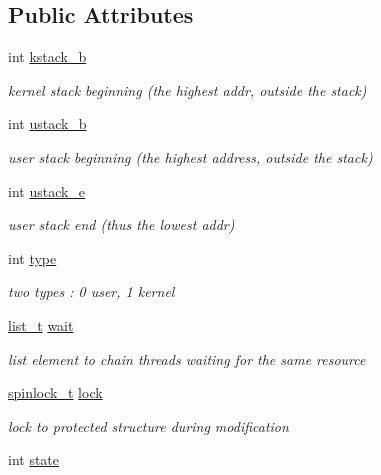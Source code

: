 \subsection*{Public Attributes}
\begin{DoxyCompactItemize}
\item 
int \hyperlink{structthread__s_a6885e765fcfe5d2ad0e5a07c2df3ee69}{kstack\-\_\-b}
\begin{DoxyCompactList}\small\item\em kernel stack beginning (the highest addr, outside the stack) \end{DoxyCompactList}\item 
int \hyperlink{structthread__s_a8d51270c2f7572479276f7629940c3ea}{ustack\-\_\-b}
\begin{DoxyCompactList}\small\item\em user stack beginning (the highest address, outside the stack) \end{DoxyCompactList}\item 
int \hyperlink{structthread__s_a021e8a50ddb4a5978f18d6babfc4ea6e}{ustack\-\_\-e}
\begin{DoxyCompactList}\small\item\em user stack end (thus the lowest addr) \end{DoxyCompactList}\item 
int \hyperlink{structthread__s_a2eda0c064f0ed88103b27bf2b5a640e2}{type}
\begin{DoxyCompactList}\small\item\em two types \-: 0 user, 1 kernel \end{DoxyCompactList}\item 
\hyperlink{list_8h_ad3b2684139c847cd572cb7b9679ce227}{list\-\_\-t} \hyperlink{structthread__s_a291769866cccb5d37937ef14cedc38bf}{wait}
\begin{DoxyCompactList}\small\item\em list element to chain threads waiting for the same resource \end{DoxyCompactList}\item 
\hyperlink{atomic_8h_ac96e125536af227ccca8875138c83e42}{spinlock\-\_\-t} \hyperlink{structthread__s_a483959ed6abed6c12f49643c4495a7b1}{lock}
\begin{DoxyCompactList}\small\item\em lock to protected structure during modification \end{DoxyCompactList}\item 
int \hyperlink{structthread__s_ab3fce89938b5156047553299f71a1370}{state}

\end{DoxyCompactItemize}
